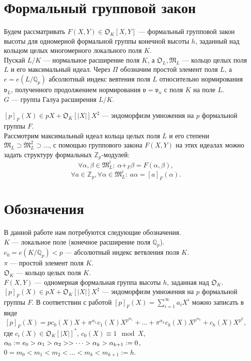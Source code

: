 \documentclass[a4paper]{article}
\newcommand{\Qp}{\mathbb{Q}_p}
\newcommand{\Zp}{\mathbb{Z}_p}
\newcommand{\ML}{\mathfrak{M}_L}
\newcommand{\OK}{\mathfrak{O}_K}
\newcommand{\OL}{\mathfrak{O}_L}
\newcommand{\val}{\mathfrak{v}}
\begin{document}
\section{Формальный групповой закон}
\paragraph{}
Будем рассматривать $F(X,Y)\in\OK[X,Y]$ --- формальный групповой закон высоты для одномерной формальной группы конечной высоты $h$, заданный над кольцом целых многомерного локального поля $K$.\\ 
Пускай $L/K$ --- нормальное расширение поля $K$, а $\OL,\ML$ --- кольцо целых поля $L$ и его максимальный идеал. Через $\Pi$ обозначим простой элемент поля $L$, а $e=e(L/\Qp)$ абсолютный индекс вевтения поля $L$ относительно нормирования $\val_L$, полученного продолжением нормирования $\val=\val_n$ с поля $K$ на поле $L$.\\
$G$ --- группа Галуа расширения $L/K$.

$[p]_F(X) \in pX+\OK[|X|]X^2$ --- эндоморфизм умножения на $p$ формальной группы $F$.\\
Рассмотрим максимальный идеал кольца целых поля $L$ и его степени $\ML\supset\ML^2\supset\dots$, с помощью группового закона $F(X,Y)$ на этих идеалах можно задать структуру формальных $\Zp$-модулей:
$$\forall\alpha,\beta\in\ML^i:\ \alpha+_F\beta=F(\alpha,\beta),$$
$$\forall a\in\Zp,\forall\alpha\in\ML^i:\ a\alpha=[a]_F(\alpha).$$

\section{Обозначения}

\paragraph{}

В данной работе нам потребуются следующие обозначения.\\
$K$ --- локальное поле (конечное расширение поля $\Qp$).\\
$e_0=e(K/\Qp)<p$ --- абсолютный индекс ветвления поля $K$.\\
$\pi$ --- простой элемент поля $K$.\\
$\OK$ --- кольцо целых поля $K$.\\
$F(X,Y)$ --- одномерная формальная группа высоты $h$, заданная над $\OK$.\\
$[p]_F(X) \in pX+\OK[|X|]X^2$ --- эндоморфизм умножения на $p$ формальной группы $F$. В соответствии с работой \cite{book2} $[p]_F(X)=\sum\limits_{i=1}^\infty a_iX^i$ можно записать в виде
$$[p]_F(X)=pc_0(X)X+\pi^{\alpha_1}c_1(X)X^{p^{m_1}}+\dots+\pi^{\alpha_k}c_k(X)X^{p^{m_k}}+c_h(X)X^{p^h},$$
где $c_i(X) \in \OK[|X|]^*$, $c_0(X) \equiv 1 \mod X$, $\alpha_0:=e_0>\alpha_1>\alpha_2>\linebreak>\dots>\alpha_k>\alpha_{k+1}:=0$, $0=m_0<m_1<m_2<\dots<m_k<m_{k+1}:=h$.
\end{document}
